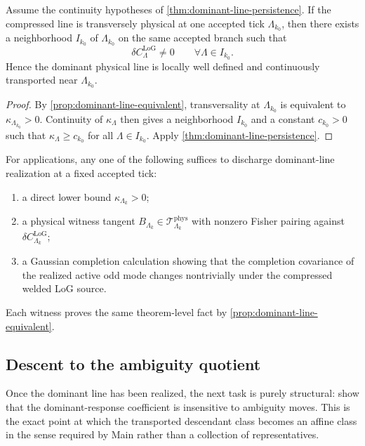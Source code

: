 \documentclass[11pt]{article}
\begin{document}
\begin{corollary}
\label{cor:dominant-line-local-persistence}
Assume the continuity hypotheses of \cref{thm:dominant-line-persistence}.
If the compressed line is transversely physical at one accepted tick \(\Lambda_{k_0}\), then there
exists a neighborhood \(I_{k_0}\) of \(\Lambda_{k_0}\) on the same accepted branch such that
\[
\delta C^{\mathrm{LoG}}_{\Lambda}\neq 0
\qquad
\forall \Lambda\in I_{k_0}.
\]
Hence the dominant physical line is locally well defined and continuously transported near
\(\Lambda_{k_0}\).
\end{corollary}

\begin{proof}
By \cref{prop:dominant-line-equivalent}, transversality at \(\Lambda_{k_0}\) is equivalent to
\(
\kappa_{\Lambda_{k_0}}>0
\).
Continuity of \(\kappa_{\Lambda}\) then gives a neighborhood \(I_{k_0}\) and a constant
\(c_{k_0}>0\) such that
\(
\kappa_{\Lambda}\ge c_{k_0}
\)
for all \(\Lambda\in I_{k_0}\).
Apply \cref{thm:dominant-line-persistence}.
\end{proof}

\begin{remark}
\label{rem:dominant-line-witnesses}
For applications, any one of the following suffices to discharge dominant-line realization at a fixed
accepted tick:
\begin{enumerate}[leftmargin=2em]
\item a direct lower bound \(\kappa_{\Lambda_k}>0\);
\item a physical witness tangent \(B_{\Lambda_k}\in\mathcal T^{\mathrm{phys}}_{\Lambda_k}\) with
  nonzero Fisher pairing against \(\delta C^{\mathrm{LoG}}_{\Lambda_k}\);
\item a Gaussian completion calculation showing that the completion covariance of the realized active
  odd mode changes nontrivially under the compressed welded LoG source.
\end{enumerate}
Each witness proves the same theorem-level fact by \cref{prop:dominant-line-equivalent}.
\end{remark}

\subsection*{Descent to the ambiguity quotient}
\label{subsec:ambiguity-quotient-descent}

Once the dominant line has been realized, the next task is purely structural:
show that the dominant-response coefficient is insensitive to ambiguity moves.
This is the exact point at which the transported descendant class becomes an affine class in the
sense required by Main rather than a collection of representatives.
\end{document}
